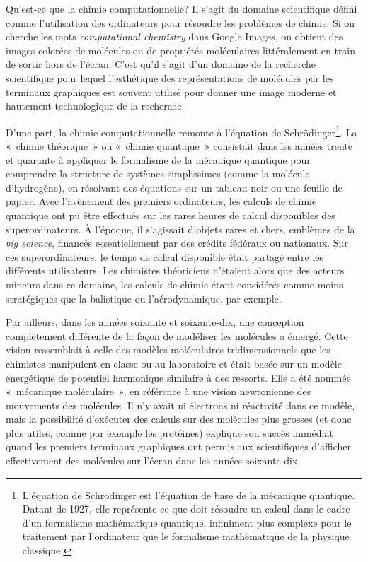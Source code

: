 \documentclass{FramateX}
\begin{document}
\begin{refsection}
Qu'est-ce que la chimie computationnelle? Il
s'agit du domaine scientifique défini comme
l'utilisation des ordinateurs pour résoudre les
problèmes de chimie. Si on cherche les mots \textit{computational
chemistry} dans Google Images, on obtient des images colorées de
molécules ou de propriétés moléculaires littéralement en train de
sortir hors de l'écran. C'est
qu'il s'agit d'un
domaine de la recherche scientifique pour lequel l'esthétique des
représentations de molécules par les terminaux graphiques est souvent
utilisé pour donner une image moderne et hautement technologique de la
recherche.

D'une part, la chimie computationnelle remonte à
l'équation de
Schrödinger\footnote{L'équation de Schrödinger est
l'équation de base de la mécanique quantique. Datant
de 1927, elle représente ce que doit résoudre un calcul dans le cadre
d'un formalisme mathématique quantique, infiniment
plus complexe pour le traitement par l'ordinateur que
le formalisme mathématique de la physique classique.}. La «~chimie
théorique~» ou «~chimie quantique~» consistait dans les années trente
et quarante à appliquer le formalisme de la mécanique quantique pour
comprendre la structure de systèmes simplissimes (comme la molécule
d'hydrogène), en résolvant des équations sur un
tableau noir ou une feuille de papier. Avec
l'avènement des premiers ordinateurs, les calculs de
chimie quantique ont pu être effectués sur les rares heures de calcul
disponibles des superordinateurs. À l'époque, il
s'agissait d'objets rares et chers,
emblèmes de la \textit{big science}, financés essentiellement par
des crédits fédéraux ou nationaux. Sur ces superordinateurs, le temps
de calcul disponible était partagé entre les différents utilisateurs.
Les chimistes théoriciens n'étaient alors que des
acteurs mineurs dans ce domaine, les calculs de chimie étant considérés
comme moins stratégiques que la balistique ou
l'aérodynamique, par exemple.

Par ailleurs, dans les années soixante et soixante-dix, une conception
complètement différente de la façon de modéliser les molécules a
émergé. Cette vision ressemblait à celle des modèles moléculaires
tridimensionnels que les chimistes manipulent en classe ou au
laboratoire et était basée sur un modèle énergétique de potentiel
harmonique similaire à des ressorts. Elle a été nommée «~mécanique
moléculaire~», en référence à une vision newtonienne des mouvements des
molécules. Il n'y avait ni électrons ni réactivité
dans ce modèle, mais la possibilité d'exécuter des
calculs sur des molécules plus grosses (et donc plus utiles, comme par
exemple les protéines) explique son succès immédiat quand les premiers
terminaux graphiques ont permis aux scientifiques
d'afficher effectivement des molécules sur
l'écran dans les années soixante-dix.


\end{refsection}
\end{document}
